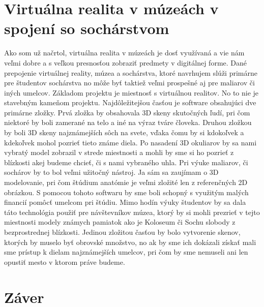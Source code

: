 \documentclass[10pt,twoside,slovak,a4paper]{article}
\begin{document}
\section{Virtuálna realita v múzeách v spojení so sochárstvom} \label{produkt}

Ako som už načrtol, virtuálna realita v múzeách je dosť využívaná a vie nám veľmi dobre a s veľkou presnosťou zobraziť predmety v digitálnej forme. Dané prepojenie virtuálnej reality, múzea a sochárstva, ktoré navrhujem slúži primárne pre študentov sochárstva no môže byť taktiež veľmi prospešné aj pre maliarov či iných umelcov. Základom projektu je miestnosť s virtuálnou realitov. No to nie je stavebným kameňom projektu. Najdôležitejšou časťou je software obsahujúci dve primárne zložky. Prvá zložka by obsahovala 3D skeny skutočných ľudí, pri čom niektoré by boli zamerané na telo a iné na výraz tváre človeka. Druhou zložkou by boli 3D skeny najznámejších sôch na svete, vďaka čomu by si kdokoľvek a kdekoľvek mohol pozrieť tieto známe diela. Po nasadení 3D okuliarov by sa nami vybratý model zobrazil v strede miestnosti a mohli by sme si ho pozrieť z blízkosti akej budeme chcieť, či s nami vybraného uhla. Pri výuke maliarov, či sochárov by to bol veľmi užitočný nástroj. Ja sám sa zaujímam o 3D modelovanie, pri čom štúdium anatómie je veľmi zložité len z referenčných 2D obrázkou. S pomocou tohoto softwaru by sme boli schopný s využitým malých financií pomôcť umelcom pri štúdiu. Mimo hodín výuky študentov by sa dala táto technológia použiť pre návštevníkov múzea, ktorý by si mohli prezrieť v tejto miestnosti modely známych pamiatok ako je Koloseum či Sochu slobody z bezprostrednej blízkosti. Jedinou zložitou časťou by bolo vytvorenie skenov, ktorých by muselo byť obrovské množstvo, no ak by sme ich dokázali získať mali sme prístup k dielam najznámejších umelcov, pri čom by sme nemuseli ani len opustiť mesto v ktorom práve budeme. 

\section{Záver} \label{zaver} %






\end{document}
